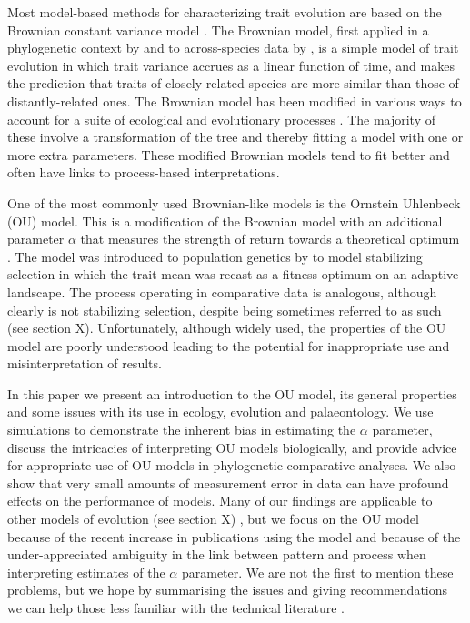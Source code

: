 \documentclass[a4paper,12pt]{article}
\begin{document}
  Most model-based methods for characterizing trait evolution are based on the Brownian constant variance model \citep[for exceptions see][]{price1997correlated,harvey2000comparative,freckleton2006detecting}. 
  The Brownian model, first applied in a phylogenetic context by \citet{cavalli1967} and to across-species data by \citet{felsenstein1973maximum}, is a simple model of trait evolution in which trait variance accrues as a linear function of time, and makes the prediction that traits of closely-related species are more similar than those of distantly-related ones. 
  The Brownian model has been modified in various ways to account for a suite of ecological and evolutionary processes \citep[e.g.,][]{grafen1989phylogenetic,hansen1997stabilizing,Pagel:1997aa,Pagel:1999aa}. 
  The majority of these involve a transformation of the tree and thereby fitting a model with one or more extra parameters. 
  These modified Brownian models tend to fit better and often have links to process-based interpretations. 

  One of the most commonly used Brownian-like models is the Ornstein Uhlenbeck (OU) model. 
  This is a modification of the Brownian model with an additional parameter $\alpha$ that measures the strength of return towards a theoretical optimum \citep{hansen1997stabilizing}. 
  The model was introduced to population genetics by \cite{Lande:1976aa} to model stabilizing selection in which the trait mean was recast as a fitness optimum on an adaptive landscape. 
  The process operating in comparative data is analogous, although clearly is not stabilizing selection, despite being sometimes referred to as such (see section X).
  Unfortunately, although widely used, the properties of the OU model are poorly understood leading to the potential for inappropriate use and misinterpretation of results.

  In this paper we present an introduction to the OU model, its general properties and some issues with its use in ecology, evolution and palaeontology. 
  We use simulations to demonstrate the inherent bias in estimating the $\alpha$ parameter, discuss the intricacies of interpreting OU models biologically, and provide advice for appropriate use of OU models in phylogenetic comparative analyses. 
  We also show that very small amounts of measurement error in data can have profound effects on the performance of models. 
  Many of our findings are applicable to other models of evolution (see section X) 
  , but we focus on the OU model because of the recent increase in publications using the model and because of the under-appreciated ambiguity in the link between pattern and process when interpreting estimates of the $\alpha$ parameter. 
  We are not the first to mention these problems, but we hope by summarising the issues and giving recommendations we can help those less familiar with the technical literature \citep[e.g.,][]{ho2013asymptotic,ho2014intrinsic,boettiger2012your,hansen2012interpreting,ives2010phylogenetic}.
\end{document}
